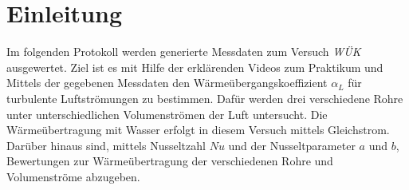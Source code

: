 %
\pagebreak
\section{Einleitung}
\label{sec:einleitung}
Im folgenden Protokoll werden generierte Messdaten zum Versuch \textit{WÜK} ausgewertet. Ziel ist es mit Hilfe der erklärenden Videos zum Praktikum und Mittels der gegebenen Messdaten den Wärmeübergangskoeffizient $\alpha_L$ für turbulente Luftströmungen zu bestimmen. Dafür werden  drei verschiedene Rohre unter unterschiedlichen Volumenströmen der Luft untersucht. Die Wärmeübertragung mit Wasser erfolgt  in diesem Versuch mittels Gleichstrom.
Darüber hinaus sind, mittels Nusseltzahl $Nu$ und der Nusseltparameter $a$ und $b$, Bewertungen zur Wärmeübertragung der verschiedenen Rohre und Volumenströme abzugeben.





